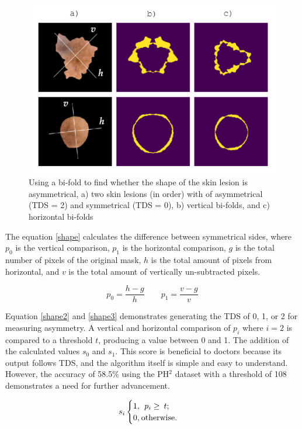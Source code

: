 \documentclass[10.5pt]{report}
\begin{document}
\begin{figure}
\centering
\includegraphics[scale=1.2]{shape.png}
\caption{Using a bi-fold to find whether the shape of the skin lesion is asymmetrical, a) two skin lesions (in order) with of asymmetrical (TDS = 2) and symmetrical (TDS = 0), b) vertical bi-folds, and c) horizontal bi-folds}
\end{figure} \label{asy1}

The equation \ref{shape} calculates the difference between symmetrical sides, where $p_0$ is the vertical comparison, $p_1$ is the horizontal comparison, $g$ is the total number of pixels of the original mask, $h$ is the total amount of pixels from horizontal, and $v$ is the total amount of vertically un-subtracted pixels.

\begin{equation} \label{shape}
p_0 = \frac{h-g}{h}\qquad
p_1 = \frac{v-g}{v}
\end{equation}

Equation \ref{shape2} and \ref{shape3} demonstrates generating the TDS of 0, 1, or 2 for measuring asymmetry. A vertical and horizontal comparison of $p_i$ where $i=2$ is compared to a threshold $t$, producing a value between 0 and 1. The addition of the calculated values $s_0$ and $s_1$. This score is beneficial to doctors because its output follows TDS, and the algorithm itself is simple and easy to understand. However, the accuracy of 58.5\% using the PH$^2$ dataset with a threshold of 108 demonstrates a need for further advancement.

\begin{equation} \label{shape2}
s_i
\begin{cases}
1,\:\:p_i\geq\:t; \\
0,\:$otherwise$.
\end{cases}
\end{equation}
\end{document}
